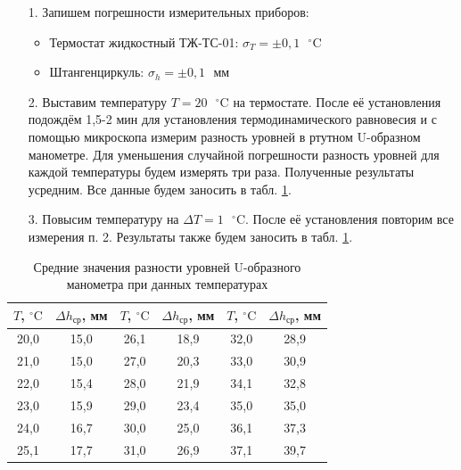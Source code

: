 \documentclass[a4paper, 12pt]{article}
\begin{document}
    \begin{enumerate}
    
        \item[1.] Запишем погрешности измерительных приборов:
            \begin{itemize}
                \item Термостат жидкостный ТЖ-ТС-01: $\sigma_T = \pm 0,1 \text{ } ^\circ\text{C}$
                \item Штангенциркуль: $\sigma_h = \pm 0,1 \text{ } мм$
            \end{itemize}
            
        \item[2.] Выставим температуру $T = 20 \text{ } ^\circ\text{C}$ на термостате. После её установления подождём 1,5-2 мин для установления термодинамического равновесия и с помощью микроскопа измерим разность уровней в ртутном U-образном манометре. Для уменьшения случайной погрешности разность уровней для каждой температуры будем измерять три раза. Полученные результаты усредним. Все данные будем заносить в табл. \ref{table1}.
        
        \item[3.] Повысим температуру на $\Delta T = 1 \text{ } ^\circ\text{C}$. После её установления повторим все измерения п. 2. Результаты также будем заносить в табл. \ref{table1}.
        
    \end{enumerate}
    
    \begin{table}[ht]
        \centering
        \captionsetup{justification=centering, margin=2cm}
        \begin{tabular}{||c|c||c|c||c|c||}
            \hline
            $T$, $^\circ\text{C}$ & $\Delta h_\text{ср}$, мм & $T$, $^\circ\text{C}$ & $\Delta h_\text{ср}$, мм & $T$, $^\circ\text{C}$ & $\Delta h_\text{ср}$, мм \\
            \hline
            20,0 & 15,0 & 26,1 & 18,9 & 32,0 & 28,9 \\
            \hline
            21,0 & 15,0 & 27,0 & 20,3 & 33,0 & 30,9 \\
            \hline
            22,0 & 15,4 & 28,0 & 21,9 & 34,1 & 32,8 \\
            \hline
            23,0 & 15,9 & 29,0 & 23,4 & 35,0 & 35,0 \\
            \hline
            24,0 & 16,7 & 30,0 & 25,0 & 36,1 & 37,3 \\
            \hline
            25,1 & 17,7 & 31,0 & 26,9 & 37,1 & 39,7 \\
            \hline
        \end{tabular}
        \caption{Средние значения разности уровней U-образного манометра при данных температурах}
        \label{table1}
    \end{table}
    
\end{document}
